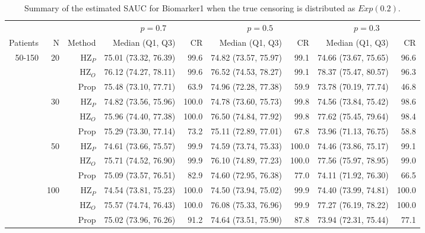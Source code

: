 \begin{table}[!htb]

\caption{\label{tab:sauc1}Summary of the estimated SAUC for Biomarker1 when the true censoring is distributed as $Exp(0.2)$.}
\centering
\begin{threeparttable}
\begin{tabular}[t]{rrrrrrrrr}
\toprule
\multicolumn{1}{c}{} & \multicolumn{1}{c}{} & \multicolumn{1}{c}{} & \multicolumn{2}{c}{$p = 0.7$} & \multicolumn{2}{c}{$p = 0.5$} & \multicolumn{2}{c}{$p = 0.3$} \\
\cmidrule(l{3pt}r{3pt}){4-5} \cmidrule(l{3pt}r{3pt}){6-7} \cmidrule(l{3pt}r{3pt}){8-9}
Patients & N & Method & Median (Q1, Q3) & CR & Median (Q1, Q3) & CR & Median (Q1, Q3) & CR\\
\midrule
50-150 & 20 & HZ$_P$ & 75.01 (73.32, 76.39) & 99.6 & 74.82 (73.57, 75.97) & 99.1 & 74.66 (73.67, 75.65) & 96.6\\
 &  & HZ$_O$ & 76.12 (74.27, 78.11) & 99.6 & 76.52 (74.53, 78.27) & 99.1 & 78.37 (75.47, 80.57) & 96.3\\
 &  & Prop & 75.48 (73.10, 77.71) & 63.9 & 74.96 (72.28, 77.38) & 59.9 & 73.78 (70.19, 77.74) & 46.8\\
\addlinespace
 & 30 & HZ$_P$ & 74.82 (73.56, 75.96) & 100.0 & 74.78 (73.60, 75.73) & 99.8 & 74.56 (73.84, 75.42) & 98.6\\
 &  & HZ$_O$ & 75.96 (74.40, 77.38) & 100.0 & 76.50 (74.84, 77.92) & 99.8 & 77.62 (75.45, 79.64) & 98.4\\
 &  & Prop & 75.29 (73.30, 77.14) & 73.2 & 75.11 (72.89, 77.01) & 67.8 & 73.96 (71.13, 76.75) & 58.8\\
\addlinespace
 & 50 & HZ$_P$ & 74.61 (73.66, 75.57) & 99.9 & 74.59 (73.74, 75.33) & 100.0 & 74.46 (73.86, 75.17) & 99.1\\
 &  & HZ$_O$ & 75.71 (74.52, 76.90) & 99.9 & 76.10 (74.89, 77.23) & 100.0 & 77.56 (75.97, 78.95) & 99.0\\
 &  & Prop & 75.09 (73.57, 76.51) & 82.9 & 74.60 (72.95, 76.38) & 77.0 & 74.11 (71.92, 76.30) & 66.5\\
\addlinespace
 & 100 & HZ$_P$ & 74.54 (73.81, 75.23) & 100.0 & 74.50 (73.94, 75.02) & 99.9 & 74.40 (73.99, 74.81) & 100.0\\
 &  & HZ$_O$ & 75.57 (74.74, 76.43) & 100.0 & 76.08 (75.33, 76.96) & 99.9 & 77.27 (76.19, 78.22) & 100.0\\
 &  & Prop & 75.02 (73.96, 76.26) & 91.2 & 74.64 (73.51, 75.90) & 87.8 & 73.94 (72.31, 75.44) & 77.1\\

\end{tabular}
\end{threeparttable}
\end{table}
